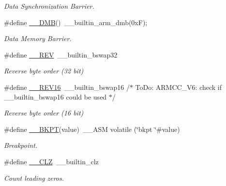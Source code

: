 \begin{DoxyCompactItemize}
\begin{DoxyCompactList}\small\item\em Data Synchronization Barrier. \end{DoxyCompactList}\item 
\#define \mbox{\hyperlink{group___c_m_s_i_s___core___instruction_interface_ga671101179b5943990785f36f8c1e2269}{\+\_\+\+\_\+\+D\+MB}}()~\+\_\+\+\_\+builtin\+\_\+arm\+\_\+dmb(0x\+F);
\begin{DoxyCompactList}\small\item\em Data Memory Barrier. \end{DoxyCompactList}\item 
\#define \mbox{\hyperlink{group___c_m_s_i_s___core___instruction_interface_ga14f54807872c0f5e05604c4924abfdae}{\+\_\+\+\_\+\+R\+EV}}~\+\_\+\+\_\+builtin\+\_\+bswap32
\begin{DoxyCompactList}\small\item\em Reverse byte order (32 bit) \end{DoxyCompactList}\item 
\#define \mbox{\hyperlink{group___c_m_s_i_s___core___instruction_interface_ga4e3acd41e7667cdf65ffcd8c76a8613f}{\+\_\+\+\_\+\+R\+E\+V16}}~\+\_\+\+\_\+builtin\+\_\+bswap16                           /$\ast$ To\+Do\+:  A\+R\+M\+C\+C\+\_\+\+V6\+: check if \+\_\+\+\_\+builtin\+\_\+bswap16 could be used $\ast$/
\begin{DoxyCompactList}\small\item\em Reverse byte order (16 bit) \end{DoxyCompactList}\item 
\#define \mbox{\hyperlink{group___c_m_s_i_s___core___instruction_interface_ga15ea6bd3c507d3e81c3b3a1258e46397}{\+\_\+\+\_\+\+B\+K\+PT}}(value)~\+\_\+\+\_\+\+A\+SM volatile (\char`\"{}bkpt \char`\"{}\#value)
\begin{DoxyCompactList}\small\item\em Breakpoint. \end{DoxyCompactList}\item 
\#define \mbox{\hyperlink{group___c_m_s_i_s___core___instruction_interface_ga5d5bb1527e042be4a9fa5a33f65cc248}{\+\_\+\+\_\+\+C\+LZ}}~\+\_\+\+\_\+builtin\+\_\+clz
\begin{DoxyCompactList}\small\item\em Count leading zeros. \end{DoxyCompactList}\item 
\mbox{\label{group___c_m_s_i_s___core___instruction_interface_gabc17e391c13c71702366c67cba39c276}} 

\end{DoxyCompactItemize}
